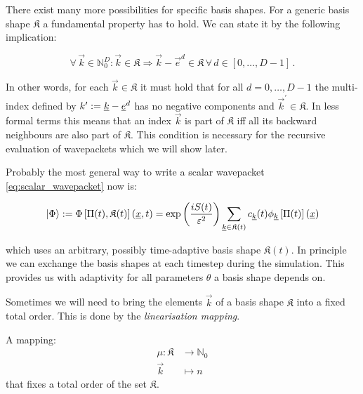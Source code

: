 There exist many more possibilities for specific basis shapes. For a generic
basis shape $\mathfrak{K}$ a fundamental property has to hold. We can state
it by the following implication:

\begin{equation}
  \forall\, \vec{k} \in \mathbb{N}_0^D:
  \vec{k} \in \mathfrak{K} \Rightarrow \vec{k} - \vec{e}^d \in \mathfrak{K} \,\forall\, d \in [0, \ldots, D-1] \,.
\end{equation}


In other words, for each $\vec{k} \in \mathfrak{K}$ it must hold that for all
$d = 0, \ldots, D-1$ the multi-index defined by $k^\prime := \underline{k} - \underline{e}^d$
has no negative components and $\vec{k}^\prime \in \mathfrak{K}$. In less formal
terms this means that an index $\vec{k}$ is part of $\mathfrak{K}$ iff all its
backward neighbours are also part of $\mathfrak{K}$. This condition is necessary
for the recursive evaluation of wavepackets which we will show later.

Probably the most general way to write a scalar wavepacket \eqref{eq:scalar_wavepacket}
now is:

\begin{equation}
  \Ket{\Phi} :=
  \Phi\left[\Pi(t), \mathfrak{K}(t)\right](\underline{x}, t)
  =
  \exp\left(\frac{i S(t)}{\varepsilon^2}\right) \sum_{\underline{k}\in\mathfrak{K}(t)} c_{\underline{k}}(t) \phi_{\underline{k}}\left[\Pi(t)\right](\underline{x})
\end{equation}

which uses an arbitrary, possibly time-adaptive basis shape $\mathfrak{K}(t)$. In
principle we can exchange the basis shapes at each timestep during the simulation.
This provides us with adaptivity for all parameters $\theta$ a basis shape depends on.

Sometimes we will need to bring the elements $\vec{k}$ of a basis shape $\mathfrak{K}$
into a fixed total order. This is done by the \emph{linearisation mapping}.

\begin{definition}
  A mapping:
  \begin{align*}
    \mu : \mathfrak{K} & \rightarrow \mathbb{N}_0 \\
          \vec{k}      & \mapsto     n
  \end{align*}
  that fixes a total order of the set $\mathfrak{K}$.
\end{definition}

